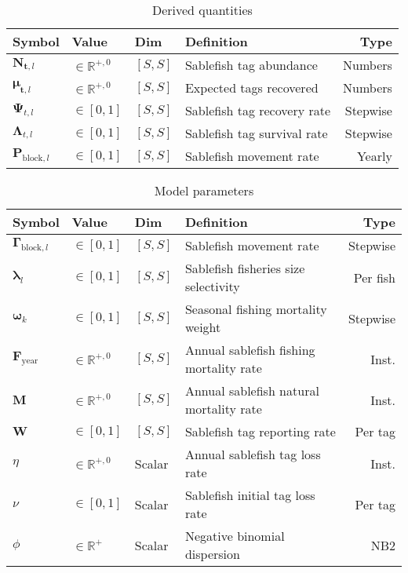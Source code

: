 \documentclass{article}
\begin{document}
\begin{table}[ht]
  \centering
  \caption{Derived quantities}
  \renewcommand\arraystretch{1.2}
  \label{tab:model-derived}
  \begin{tabular}{l l l l r}
    \toprule
    \textbf{Symbol} & \textbf{Value} & \textbf{Dim} & \textbf{Definition}  & \textbf{Type} \\
    \toprule
    $\boldsymbol{N}_{\boldsymbol{t},l}$ & $\in \mathbb{R}^{+,0}$ & $[S,S]$ & Sablefish tag abundance & Numbers \\
    $\boldsymbol{\mu}_{\boldsymbol{t},l}$ & $\in \mathbb{R}^{+,0}$ & $[S,S]$ & Expected tags recovered & Numbers \\
    $\boldsymbol{\Psi}_{t,l}$ & $\in \left[0, 1 \right]$ & $[S,S]$ & Sablefish tag recovery rate & Stepwise \\
    $\boldsymbol{\Lambda}_{t,l}$ & $\in \left[0, 1 \right]$ & $[S,S]$ & Sablefish tag survival rate & Stepwise \\    
    $\boldsymbol{P}_{\mathrm{block},l}$ & $\in \left[0, 1 \right]$ & $[S,S]$ & Sablefish movement rate & Yearly \\
    \bottomrule
  \end{tabular}
\end{table}

\begin{table}[ht]
  \centering
  \caption{Model parameters}
  \renewcommand\arraystretch{1.2}
  \label{tab:model-parameters}
  \begin{tabular}{l l l l r}
    \toprule
    \textbf{Symbol} & \textbf{Value} & \textbf{Dim} & \textbf{Definition} & \textbf{Type} \\
    \toprule
    $\boldsymbol{\Gamma}_{\mathrm{block},l}$ & $\in \left[0, 1 \right]$ & $[S,S]$ & Sablefish movement rate & Stepwise \\
    $\boldsymbol{\lambda}_{l}$ & $\in \left[0, 1 \right]$ & $[S,S]$ & Sablefish fisheries size selectivity & Per fish \\    
    $\boldsymbol{\omega}_{k}$ &  $\in \left[0, 1 \right]$ & $[S,S]$ & Seasonal fishing mortality weight & Stepwise \\
    $\boldsymbol{F}_{\mathrm{year}}$ & $\in \mathbb{R}^{+,0}$ & $[S,S]$ & Annual sablefish fishing mortality rate & Inst. \\
    $\boldsymbol{M}$ & $\in \mathbb{R}^{+,0}$ & $[S,S]$ & Annual sablefish natural mortality rate & Inst. \\
    $\boldsymbol{W}$ & $\in \left[0, 1 \right]$ & $[S,S]$ & Sablefish tag reporting rate & Per tag \\        
    $\eta$ & $\in \mathbb{R}^{+,0}$ & Scalar & Annual sablefish tag loss rate & Inst. \\    
    $\nu$ & $\in \left[0, 1 \right]$ & Scalar & Sablefish initial tag loss rate & Per tag \\
    $\phi$ & $\in \mathbb{R}^{+}$ & Scalar & Negative binomial dispersion & NB2 \\
    \bottomrule
  \end{tabular}
\end{table}

\end{document}
